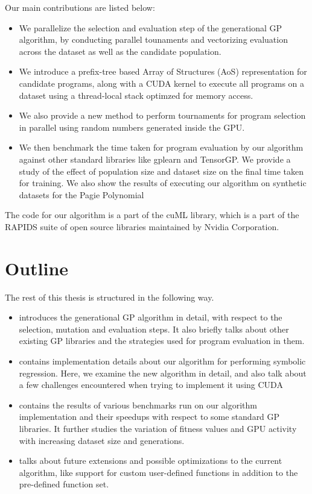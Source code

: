 Our main contributions are listed below:
\begin{itemize}
  \item We parallelize the selection and evaluation step of the generational GP algorithm, by conducting parallel tounaments and vectorizing evaluation across the dataset as well as the candidate population. 
  \item We introduce a prefix-tree based Array of Structures (AoS) representation for candidate programs, along with a CUDA kernel to execute all programs on a dataset using a thread-local stack optimzed for memory access. 
  \item We also provide a new method to perform tournaments for program selection in parallel using random numbers generated inside the GPU. 
  \item We then benchmark the time taken for program evaluation by our algorithm against other standard libraries like gplearn\citep{gplearn} and TensorGP\citep{baeta2021tensorgp}. We provide a study of the effect of population size and dataset size on the final time taken for training. We also show the results of executing our algorithm on synthetic datasets for the Pagie Polynomial\cite{Pagie1997}
\end{itemize}

The code for our algorithm is a part of the cuML library\citep{raschka2020machine}, which is a part of the RAPIDS suite of open source libraries maintained by Nvidia Corporation.

\section{Outline}
\label{intro:outline}

The rest of this thesis is structured in the following way. 
\begin{itemize}
  \item {} introduces the generational GP algorithm in detail, with respect to the selection, mutation and evaluation steps. It also briefly talks about other existing GP libraries and the strategies used for program evaluation in them. 
  \item {} contains implementation details about our algorithm for performing symbolic regression. Here, we examine the new algorithm in detail, and also talk about a few challenges encountered when trying to implement it using CUDA
  \item {} contains the results of various benchmarks run on our algorithm implementation and their speedups with respect to some standard GP libraries. It further studies the variation of fitness values and GPU activity with increasing dataset size and generations.
  \item {} talks about future extensions and possible optimizations to the current algorithm, like support for custom user-defined functions in addition to the pre-defined function set.
\end{itemize}
